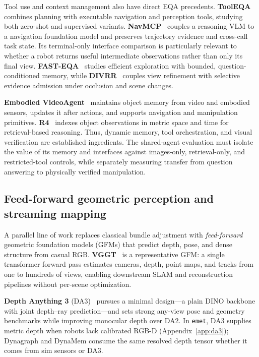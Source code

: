Tool use and context management also have direct EQA precedents.
\textbf{ToolEQA}~\citep{zhai2025tooleqa} combines planning with executable navigation and perception tools, studying both zero-shot and supervised variants.
\textbf{NavMCP}~\citep{lei2026navmcp} couples a reasoning VLM to a navigation foundation model and preserves trajectory evidence and cross-call task state.
Its terminal-only interface comparison is particularly relevant to whether a robot returns useful intermediate observations rather than only its final view.
\textbf{FAST-EQA}~\citep{zhang2026fasteqa} studies efficient exploration with bounded, question-conditioned memory, while \textbf{DIVRR}~\citep{lu2026divrr} couples view refinement with selective evidence admission under occlusion and scene changes.

\textbf{Embodied VideoAgent}~\citep{fan2025embodiedvideoagent} maintains object memory from video and embodied sensors, updates it after actions, and supports navigation and manipulation primitives.
\textbf{R4}~\citep{sohn2026rfour} indexes object observations in metric space and time for retrieval-based reasoning.
Thus, dynamic memory, tool orchestration, and visual verification are established ingredients.
The shared-agent evaluation must isolate the value of its memory and interfaces against images-only, retrieval-only, and restricted-tool controls, while separately measuring transfer from question answering to physically verified manipulation.

\subsection{Feed-forward geometric perception and streaming mapping}

A parallel line of work replaces classical bundle adjustment with \emph{feed-forward} geometric foundation models (GFMs) that predict depth, pose, and dense structure from casual RGB.
\textbf{VGGT}~\citep{wang2025vggt} is a representative GFM: a single transformer forward pass estimates cameras, depth, point maps, and tracks from one to hundreds of views, enabling downstream SLAM and reconstruction pipelines without per-scene optimization.

\textbf{Depth Anything 3} (DA3)~\citep{lin2025depthanything3} pursues a minimal design---a plain DINO backbone with joint depth--ray prediction---and sets strong any-view pose and geometry benchmarks while improving monocular depth over DA2.
In \texttt{emet}, DA3 supplies metric depth when robots lack calibrated RGB-D (Appendix~\ref{app:da3}); Dynagraph and DynaMem consume the same resolved depth tensor whether it comes from sim sensors or DA3.

